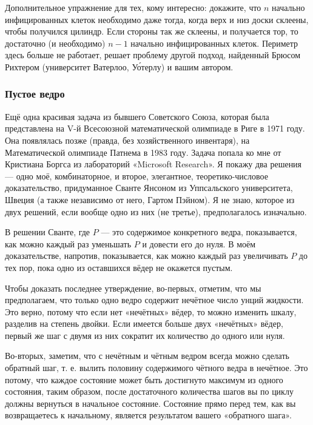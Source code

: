 Дополнительное упражнение для тех, кому интересно: докажите, что $n$ начально инфицированных клеток необходимо даже тогда, когда верх и низ доски склеены, чтобы получился цилиндр.
Если стороны так же склеены, и получается тор, то достаточно (и необходимо) $n-1$ начально инфицированных клеток.
Периметр здесь больше не работает,
решает проблему другой подход, найденный Брюсом Рихтером (университет Ватерлоо, Уо́терлу) %
и вашим автором.

\subsubsection*{Пустое ведро}%

Ещё одна красивая задача из бывшего Советского Союза, которая была представлена на V-й Всесоюзной математической олимпиаде в Риге в 1971 году.
Она появлялась позже (правда, без хозяйственного инвентаря), на Математической олимпиаде Патнема в 1983 году.
Задача попала ко мне от Кристиана Боргса из лабораторий «Microsoft Research». %
Я покажу два решения --- одно моё, комбинаторное, и второе, элегантное, теоретико-числовое доказательство, придуманное Сванте Янсоном из Уппсальского университета, Швеция %
(а также независимо от него, Гартом Пэйном). %
Я не знаю, которое из двух решений, если вообще одно из них (не третье), предполагалось изначально.

В решении Сванте, где $P$ --- это содержимое конкретного ведра, показывается, как можно каждый раз уменьшать $P$ и довести его до нуля.
В моём доказательстве, напротив, показывается, как можно каждый раз увеличивать $P$ до тех пор, пока одно из оставшихся вёдер не окажется пустым.

Чтобы доказать последнее утверждение, во-первых, отметим, что мы предполагаем, что только одно ведро содержит нечётное число унций жидкости.
Это верно, потому что если нет «нечётных» вёдер, то можно изменить шкалу, разделив на степень двойки.
Если имеется больше двух «нечётных» вёдер, первый же шаг с двумя из них сократит их количество до одного или нуля.

Во-вторых, заметим, что с нечётным и чётным ведром всегда можно сделать обратный шаг, т. е. вылить половину содержимого чётного ведра в нечётное.
Это потому, что каждое состояние может быть достигнуто максимум из одного состояния, таким образом, после достаточного количества шагов вы по циклу должны вернуться в начальное состояние.
Состояние прямо перед тем, как вы возвращаетесь к начальному, является результатом вашего «обратного шага».

